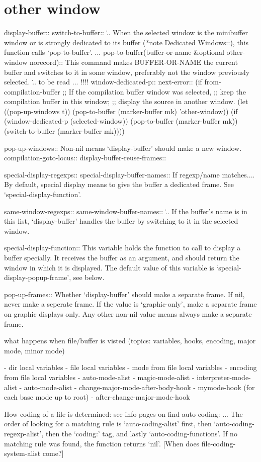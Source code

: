 \documentclass[a4paper]{report}
\begin{document}
\section{other window}

display-buffer::
switch-to-buffer::
\... When the selected window is the minibuffer window or is strongly
dedicated to its buffer (*note Dedicated Windows::), this function calls
`pop-to-buffer'. ...
pop-to-buffer(buffer-or-name &optional other-window norecord)::
This command makes BUFFER-OR-NAME the current buffer and switches
to it in some window, preferably not the window previously
selected. 
\... to be read ... !!!!
window-dedicated-p::
next-error::
(if from-compilation-buffer
        ;; If the compilation buffer window was selected,
        ;; keep the compilation buffer in this window;
        ;; display the source in another window.
        (let ((pop-up-windows t))
          (pop-to-buffer (marker-buffer mk) 'other-window))
      (if (window-dedicated-p (selected-window))
          (pop-to-buffer (marker-buffer mk))
        (switch-to-buffer (marker-buffer mk))))




pop-up-windows::
  Non-nil means `display-buffer' should make a new window.
compilation-goto-locus::
display-buffer-reuse-frames::

special-display-regexps::
special-display-buffer-names::
If regexp/name matches.... By default, special display means to give the
buffer a dedicated frame. See `special-display-function'.

same-window-regexps::
same-window-buffer-names::
\... If the buffer's name is in this list, `display-buffer' handles the buffer by
switching to it in the selected window.

special-display-function::
This variable holds the function to call to display a buffer
specially.  It receives the buffer as an argument, and should
return the window in which it is displayed.  The default value of
this variable is `special-display-popup-frame', see below.


pop-up-frames::
Whether `display-buffer' should make a separate frame.
If nil, never make a seperate frame.
If the value is `graphic-only', make a separate frame
on graphic displays only.
Any other non-nil value means always make a separate frame.
  


what happens when file/buffer is visted (topics: variables, hooks, encoding,
major mode, minor mode)

- dir local variables
- file local variables
  - mode from file local variables
  - encoding from file local variables
- auto-mode-alist
- magic-mode-alist
- interpreter-mode-alist
- auto-mode-alist
- change-major-mode-after-body-hook
- mymode-hook (for each base mode up to root)
- after-change-major-mode-hook


How coding of a file is determined: see info pages on find-auto-coding:
... The order of looking for a matching rule is ‘auto-coding-alist’ first,
then ‘auto-coding-regexp-alist’, then the ‘coding:’ tag, and lastly
‘auto-coding-functions’.  If no matching rule was found, the function returns
‘nil’. [When does file-coding-system-alist come?]
\end{document}
